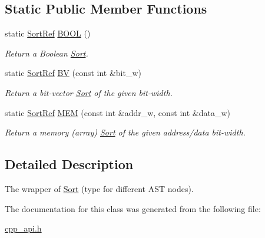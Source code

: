 \subsection*{Static Public Member Functions}
\begin{DoxyCompactItemize}
\item 
\mbox{\label{classilang_1_1_sort_ref_ac67c1ae73429fd30fcf834e40b118b7d}} 
static \mbox{\hyperlink{classilang_1_1_sort_ref}{Sort\+Ref}} \mbox{\hyperlink{classilang_1_1_sort_ref_ac67c1ae73429fd30fcf834e40b118b7d}{B\+O\+OL}} ()
\begin{DoxyCompactList}\small\item\em Return a Boolean \mbox{\hyperlink{classilang_1_1_sort}{Sort}}. \end{DoxyCompactList}\item 
\mbox{\label{classilang_1_1_sort_ref_a8726f5f913df9992da0c92321214950d}} 
static \mbox{\hyperlink{classilang_1_1_sort_ref}{Sort\+Ref}} \mbox{\hyperlink{classilang_1_1_sort_ref_a8726f5f913df9992da0c92321214950d}{BV}} (const int \&bit\+\_\+w)
\begin{DoxyCompactList}\small\item\em Return a bit-\/vector \mbox{\hyperlink{classilang_1_1_sort}{Sort}} of the given bit-\/width. \end{DoxyCompactList}\item 
\mbox{\label{classilang_1_1_sort_ref_abc0d7cb589180c0455d8485991e07c39}} 
static \mbox{\hyperlink{classilang_1_1_sort_ref}{Sort\+Ref}} \mbox{\hyperlink{classilang_1_1_sort_ref_abc0d7cb589180c0455d8485991e07c39}{M\+EM}} (const int \&addr\+\_\+w, const int \&data\+\_\+w)
\begin{DoxyCompactList}\small\item\em Return a memory (array) \mbox{\hyperlink{classilang_1_1_sort}{Sort}} of the given address/data bit-\/width. \end{DoxyCompactList}\end{DoxyCompactItemize}


\subsection{Detailed Description}
The wrapper of \mbox{\hyperlink{classilang_1_1_sort}{Sort}} (type for different A\+ST nodes). 

The documentation for this class was generated from the following file\+:\begin{DoxyCompactItemize}
\item 
\mbox{\hyperlink{cpp__api_8h}{cpp\+\_\+api.\+h}}\end{DoxyCompactItemize}

